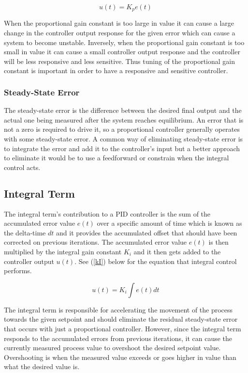 \documentclass[10pt,conference]{IEEEtran}
\begin{document}
\begin{equation}
    \displaystyle {u(t)=K_pe(t)}\label{kP}
\end{equation}

When the proportional gain constant is too large in value it can cause a large change in the controller
output response for the given error which can cause a system to become unstable. Inversely, when the
proportional gain  constant is too small in value it can cause a small controller output response and
the controller will be less responsive and less sensitive. Thus tuning of the proportional gain
constant is important in order to have a responsive and sensitive controller.

\subsubsection{Steady-State Error}

The steady-state error is the difference between the desired final output and the actual one being
measured after the system reaches equilibrium. An error that is not a zero is required to drive
it, so a proportional controller generally operates with some steady-state error. A common way
of eliminating steady-state error is to integrate the error and add it to the controller's input
but a better approach to eliminate it would be to use a feedforward or constrain when the
integral control acts.

\subsection{Integral Term}

The integral term's contribution to a PID controller is the sum of the accumulated error 
value \(e(t)\) over a specific amount of time which is known as the delta-time \(dt\) and 
it provides the accumulated offset that should have been corrected on previous iterations. 
The accumulated error value \(e(t)\) is then multiplied by the integral gain constant 
\(K_i\) and it then gets added to the controller output \(u(t)\). See (\ref{kI}) below 
for the equation that integral control performs.

\begin{equation}
    \displaystyle {u(t)=K_i\int e(t)dt}\label{kI}
\end{equation}

The integral term is responsible for accelerating the movement of the process towards the given
setpoint and should eliminate the residual steady-state error that occurs with just a proportional
controller. However, since the integral term responds to the accumulated errors from previous
iterations, it can cause the currently measured process value to overshoot the desired setpoint
value. Overshooting is when the measured value exceeds or goes higher in value than what the
desired value is.
\end{document}
